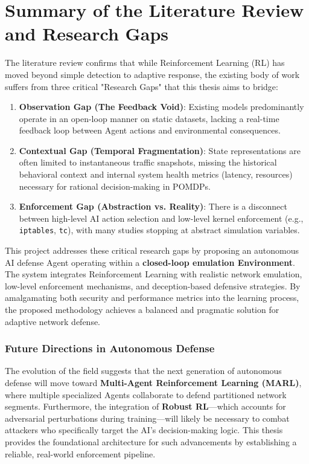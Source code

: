 \documentclass[12pt,a4paper]{report}
\begin{document}
\section{Summary of the Literature Review and Research Gaps}

The literature review confirms that while Reinforcement Learning (RL) has moved beyond simple detection to adaptive response, the existing body of work suffers from three critical "Research Gaps" that this thesis aims to bridge:

\begin{enumerate}
    \item \textbf{Observation Gap (The Feedback Void)}: Existing models predominantly operate in an open-loop manner on static datasets, lacking a real-time feedback loop between Agent actions and environmental consequences.
    \item \textbf{Contextual Gap (Temporal Fragmentation)}: State representations are often limited to instantaneous traffic snapshots, missing the historical behavioral context and internal system health metrics (latency, resources) necessary for rational decision-making in POMDPs.
    \item \textbf{Enforcement Gap (Abstraction vs. Reality)}: There is a disconnect between high-level AI action selection and low-level kernel enforcement (e.g., \texttt{iptables}, \texttt{tc}), with many studies stopping at abstract simulation variables.
\end{enumerate}

This project addresses these critical research gaps by proposing an autonomous AI defense Agent operating within a \textbf{closed-loop emulation Environment}. The system integrates Reinforcement Learning with realistic network emulation, low-level enforcement mechanisms, and deception-based defensive strategies. By amalgamating both security and performance metrics into the learning process, the proposed methodology achieves a balanced and pragmatic solution for adaptive network defense.

\subsubsection*{Future Directions in Autonomous Defense}

The evolution of the field suggests that the next generation of autonomous defense will move toward \textbf{Multi-Agent Reinforcement Learning (MARL)}, where multiple specialized Agents collaborate to defend partitioned network segments. Furthermore, the integration of \textbf{Robust RL}—which accounts for adversarial perturbations during training—will likely be necessary to combat attackers who specifically target the AI's decision-making logic. This thesis provides the foundational architecture for such advancements by establishing a reliable, real-world enforcement pipeline.
\end{document}
